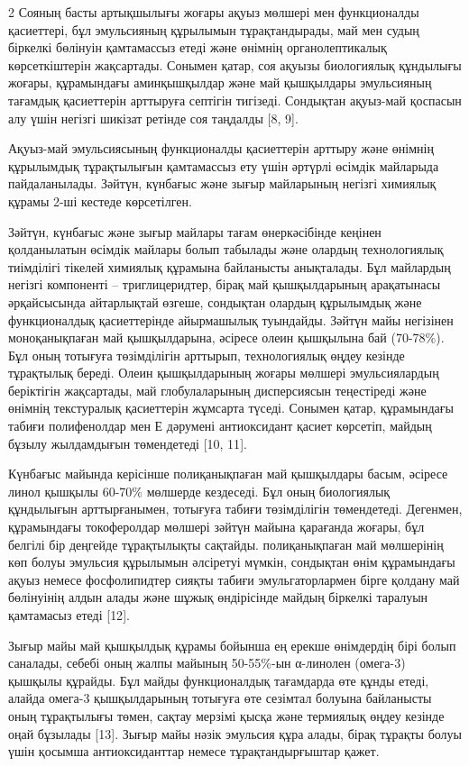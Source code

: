 \vspace{-0.6cm}
\begin{multicols}{2}
Сояның басты артықшылығы жоғары ақуыз мөлшері мен функционалды
қасиеттері, бұл эмульсияның құрылымын тұрақтандырады, май мен судың
біркелкі бөлінуін қамтамассыз етеді және өнімнің органолептикалық
көрсеткіштерін жақсартады. Сонымен қатар, соя ақуызы биологиялық
құндылығы жоғары, құрамындағы аминқышқылдар және май қышқылдары
эмульсияның тағамдық қасиеттерін арттыруға септігін тигізеді. Сондықтан
ақуыз-май қоспасын алу үшін негізгі шикізат ретінде соя таңдалды {[}8,
9{]}.

Ақуыз-май эмульсиясының функционалды қасиеттерін арттыру және өнімнің
құрылымдық тұрақтылығын қамтамассыз ету үшін әртүрлі өсімдік майларыда
пайдаланылады. Зәйтүн, күнбағыс және зығыр майларының негізгі химиялық
құрамы 2-ші кестеде көрсетілген.

Зәйтүн, күнбағыс және зығыр майлары тағам өнеркәсібінде кеңінен
қолданылатын өсімдік майлары болып табылады және олардың технологиялық
тиімділігі тікелей химиялық құрамына байланысты анықталады. Бұл
майлардың негізгі компоненті -- триглицеридтер, бірақ май қышқылдарының
арақатынасы әрқайсысында айтарлықтай өзгеше, сондықтан олардың
құрылымдық және функционалдық қасиеттерінде айырмашылық туындайды.
Зәйтүн майы негізінен моноқанықпаған май қышқылдарына, әсіресе олеин
қышқылына бай (70-78\%). Бұл оның тотығуға төзімділігін арттырып,
технологиялық өңдеу кезінде тұрақтылық береді. Олеин қышқылдарының
жоғары мөлшері эмульсиялардың беріктігін жақсартады, май глобулаларының
дисперсиясын теңестіреді және өнімнің текстуралық қасиеттерін жұмсарта
түседі. Сонымен қатар, құрамындағы табиғи полифенолдар мен Е дәрумені
антиоксидант қасиет көрсетіп, майдың бұзылу жылдамдығын төмендетеді
{[}10, 11{]}.

Күнбағыс майында керісінше полиқанықпаған май қышқылдары басым, әсіресе
линол қышқылы 60-70\% мөлшерде кездеседі. Бұл оның биологиялық
құндылығын арттырғанымен, тотығуға табиғи төзімділігін төмендетеді.
Дегенмен, құрамындағы токоферолдар мөлшері зәйтүн майына қарағанда
жоғары, бұл белгілі бір деңгейде тұрақтылықты сақтайды. полиқанықпаған
май мөлшерінің көп болуы эмульсия құрылымын әлсіретуі мүмкін, сондықтан
өнім құрамындағы ақуыз немесе фосфолипидтер сияқты табиғи
эмульгаторлармен бірге қолдану май бөлінуінің алдын алады және шұжық
өндірісінде майдың біркелкі таралуын қамтамасыз етеді {[}12{]}.

Зығыр майы май қышқылдық құрамы бойынша ең ерекше өнімдердің бірі болып
саналады, себебі оның жалпы майының 50-55\%-ын α-линолен (омега-3)
қышқылы құрайды. Бұл майды функционалдық тағамдарда өте құнды етеді,
алайда омега-3 қышқылдарының тотығуға өте сезімтал болуына байланысты
оның тұрақтылығы төмен, сақтау мерзімі қысқа және термиялық өңдеу
кезінде оңай бұзылады {[}13{]}. Зығыр майы нәзік эмульсия құра алады,
бірақ тұрақты болуы үшін қосымша антиоксиданттар немесе
тұрақтандырғыштар қажет.


\end{multicols}
